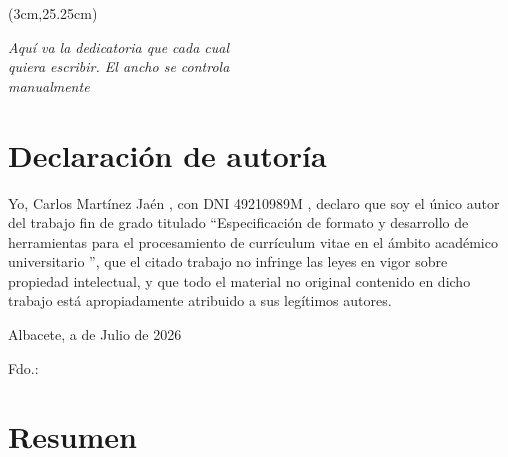 \begin{textblock*}{\textwidth}(3cm,25.25cm) 
\begin{flushright}
{\fontsize{14pt}{4pt}\selectfont \fecha}
\end{flushright}
\end{textblock*}


\cleardoublepage
\thispagestyle{empty}

\vspace*{9cm}  
\begin{flushright} \em 
Aquí va la dedicatoria que cada cual \\ 
quiera escribir. El ancho se controla \\ 
manualmente
\end{flushright}


\cleardoublepage
\thispagestyle{plain}
\chapter*{Declaración de autoría}


Yo, \quad Carlos Martínez Jaén \quad, con DNI \quad 49210989M \quad, declaro que soy el único autor del trabajo fin de grado titulado ``\quad Especificación de formato y desarrollo de herramientas para el procesamiento de currículum vitae en el ámbito académico universitario \quad'', que el citado trabajo no infringe las leyes en vigor sobre propiedad intelectual, y que todo el material no original contenido en dicho trabajo está apropiadamente atribuido a sus legítimos autores.

\vspace*{2cm}
\begin{center}
Albacete, a  \quad de \quad Julio \quad de 2026

\vskip3cm

Fdo.: \autor
\end{center}


\cleardoublepage
\thispagestyle{plain}
\chapter*{Resumen}

